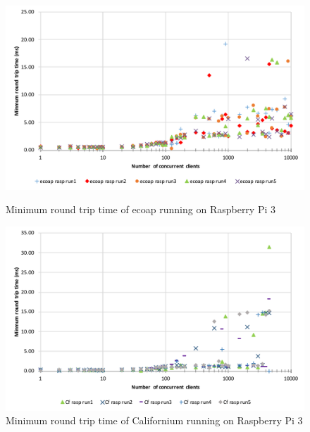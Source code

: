 \begin{figure}[!htbp]
\centering
\includegraphics[scale = 0.8]{ecoap_min_round_trip_time_rasp}
\caption{Minimum round trip time of ecoap running on Raspberry Pi 3}
\label{fig:ecoap_min_round_trip_time_rasp}
\includegraphics[scale = 0.8]{californium_min_round_trip_time_rasp}
\caption{Minimum round trip time of Californium running on Raspberry Pi 3}
\label{fig:californium_min_round_trip_time_rasp}
\end{figure}

